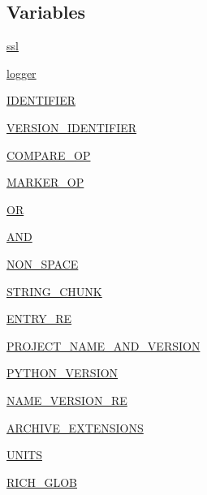 \subsection*{Variables}
\begin{DoxyCompactItemize}
\item 
\hyperlink{namespacepip_1_1__vendor_1_1distlib_1_1util_acf7b6f6b01f0f769f17101f2562eb81d}{ssl}
\item 
\hyperlink{namespacepip_1_1__vendor_1_1distlib_1_1util_a92d494ce1d95716d5b32a5e3814e0472}{logger}
\item 
\hyperlink{namespacepip_1_1__vendor_1_1distlib_1_1util_a0a724d8e1289cd40683824601073cf1f}{I\+D\+E\+N\+T\+I\+F\+I\+ER}
\item 
\hyperlink{namespacepip_1_1__vendor_1_1distlib_1_1util_a8f99bb6e498f0a241443bf78f451a0bb}{V\+E\+R\+S\+I\+O\+N\+\_\+\+I\+D\+E\+N\+T\+I\+F\+I\+ER}
\item 
\hyperlink{namespacepip_1_1__vendor_1_1distlib_1_1util_a494ed63cea95ae58fad2d3203e4fe0c4}{C\+O\+M\+P\+A\+R\+E\+\_\+\+OP}
\item 
\hyperlink{namespacepip_1_1__vendor_1_1distlib_1_1util_a0db446b10c0723942ce3553829b5c1ff}{M\+A\+R\+K\+E\+R\+\_\+\+OP}
\item 
\hyperlink{namespacepip_1_1__vendor_1_1distlib_1_1util_a0b3903e5ae9c1257c6a55d19a0661cb6}{OR}
\item 
\hyperlink{namespacepip_1_1__vendor_1_1distlib_1_1util_a2d1155f7fb6a637f9ef84ba0f16c94f2}{A\+ND}
\item 
\hyperlink{namespacepip_1_1__vendor_1_1distlib_1_1util_a4056049ebb70aa486e9f645430c9273b}{N\+O\+N\+\_\+\+S\+P\+A\+CE}
\item 
\hyperlink{namespacepip_1_1__vendor_1_1distlib_1_1util_aee4cbb09ac09fa6b9cde335731be7acb}{S\+T\+R\+I\+N\+G\+\_\+\+C\+H\+U\+NK}
\item 
\hyperlink{namespacepip_1_1__vendor_1_1distlib_1_1util_a17b3c17cb660bc6ef1525ec0c6196d8b}{E\+N\+T\+R\+Y\+\_\+\+RE}
\item 
\hyperlink{namespacepip_1_1__vendor_1_1distlib_1_1util_a0d17243a32e841ea0f52dc7087779bb7}{P\+R\+O\+J\+E\+C\+T\+\_\+\+N\+A\+M\+E\+\_\+\+A\+N\+D\+\_\+\+V\+E\+R\+S\+I\+ON}
\item 
\hyperlink{namespacepip_1_1__vendor_1_1distlib_1_1util_ae616610bc686ed93d4ce3e34e0d01922}{P\+Y\+T\+H\+O\+N\+\_\+\+V\+E\+R\+S\+I\+ON}
\item 
\hyperlink{namespacepip_1_1__vendor_1_1distlib_1_1util_a9497eee97c3c2c4636b25736e622ba38}{N\+A\+M\+E\+\_\+\+V\+E\+R\+S\+I\+O\+N\+\_\+\+RE}
\item 
\hyperlink{namespacepip_1_1__vendor_1_1distlib_1_1util_a758da332e0000a24e5fc6ecd884e40fe}{A\+R\+C\+H\+I\+V\+E\+\_\+\+E\+X\+T\+E\+N\+S\+I\+O\+NS}
\item 
\hyperlink{namespacepip_1_1__vendor_1_1distlib_1_1util_ae54138ff59735c0fa3918d97e01de4f1}{U\+N\+I\+TS}
\item 
\hyperlink{namespacepip_1_1__vendor_1_1distlib_1_1util_a56a792b08dd1d5084de3cce44a80ef77}{R\+I\+C\+H\+\_\+\+G\+L\+OB}
\end{DoxyCompactItemize}


